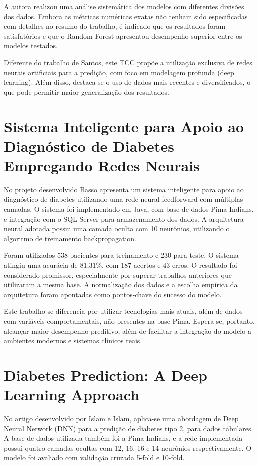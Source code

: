 A autora realizou uma análise sistemática dos modelos com diferentes divisões dos dados. Embora as métricas numéricas exatas não tenham sido especificadas com detalhes no resumo do trabalho, é indicado que os resultados foram satisfatórios e que o Random Forest apresentou desempenho superior entre os modelos testados.

Diferente do trabalho de Santos, este TCC propõe a utilização exclusiva de redes neurais artificiais para a predição, com foco em modelagem profunda (deep learning). Além disso, destaca-se o uso de dados mais recentes e diversificados, o que pode permitir maior generalização dos resultados. 

\section{Sistema Inteligente para Apoio ao Diagnóstico de Diabetes Empregando Redes Neurais}
No projeto desenvolvido Basso \cite{Basso2014} apresenta um sistema inteligente para apoio ao diagnóstico de diabetes utilizando uma rede neural feedforward com múltiplas camadas. O sistema foi implementado em Java, com base de dados Pima Indians, e integração com o SQL Server para armazenamento dos dados. A arquitetura neural adotada possui uma camada oculta com 10 neurônios, utilizando o algoritmo de treinamento backpropagation.

Foram utilizados 538 pacientes para treinamento e 230 para teste. O sistema atingiu uma acurácia de 81,31\%, com 187 acertos e 43 erros. O resultado foi considerado promissor, especialmente por superar trabalhos anteriores que utilizaram a mesma base. A normalização dos dados e a escolha empírica da arquitetura foram apontadas como pontos-chave do sucesso do modelo.

Este trabalho se diferencia por utilizar tecnologias mais atuais, além de dados com variáveis comportamentais, não presentes na base Pima. Espera-se, portanto, alcançar maior desempenho preditivo, além de facilitar a integração do modelo a ambientes modernos e sistemas clínicos reais.

\section{Diabetes Prediction: A Deep Learning Approach}
No artigo desenvolvido por Islam e Islam\cite{Islam2019}, aplica-se uma abordagem de Deep Neural Network (DNN) para a predição de diabetes tipo 2, para dados tabulares. A base de dados utilizada também foi a Pima Indians, e a rede implementada possui quatro camadas ocultas com 12, 16, 16 e 14 neurônios respectivamente. O modelo foi avaliado com validação cruzada 5-fold e 10-fold.

